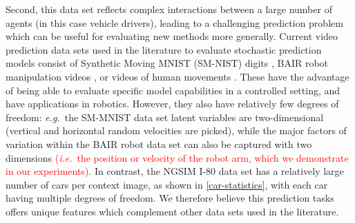 \documentclass{article}
\begin{document}
Second, this data set reflects complex interactions between a large number of agents (in this case vehicle drivers), leading to a challenging prediction problem which can be useful for evaluating new methods more generally.
Current video prediction data sets used in the literature to evaluate stochastic prediction models consist of Synthetic Moving MNIST (SM-NIST) digits \citep{Denton2018}, BAIR robot manipulation videos \citep{Ebert17}, or videos of human movements \citep{Denton2018, Babaeizadeh2018}.
These have the advantage of being able to evaluate specific model capabilities in a controlled setting, and have applications in robotics.
However, they also have relatively few degrees of freedom: \emph{e.g.}\ the SM-MNIST data set latent variables are two-dimensional (vertical and horizontal random velocities are picked), while the major factors of variation within the BAIR robot data set can also be captured with two dimensions \textcolor{red}{(\emph{i.e.}\ the position or velocity of the robot arm, which we demonstrate in our experiments)}.
In contrast, the NGSIM I-80 data set has a relatively large number of cars per context image, as shown in \cref{car-statistics}, with each car having multiple degrees of freedom.
We therefore believe this prediction tasks offers unique features which complement other data sets used in the literature.
\end{document}

